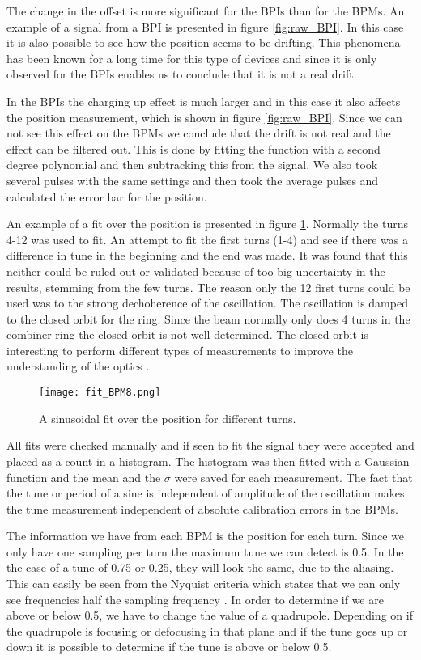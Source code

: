  
The change in the offset is more significant for the BPIs than for the BPMs. An example of a signal from a BPI is presented in figure \ref{fig:raw_BPI}. In this case it is also possible to see how the position seems to be drifting. This phenomena has been known for a long time for this type of devices and since it is only observed for the BPIs enables us to conclude that it is not a real drift.  
 

In the BPIs the charging up effect is much larger and in this case it also affects the position measurement, which is shown in figure \ref{fig:raw_BPI}. Since we can not see this effect on the BPMs we conclude that the drift is not real and the effect can be filtered out. This is done by fitting the function with a second degree polynomial and then subtracking this from the signal. We also took several pulses with the same settings and then took the average pulses and calculated the error bar for the position. 
 
 
An example of a fit over the position is presented in figure \ref{fig:fitOfPosition}. Normally the turns 4-12 was used to fit. An attempt to fit the first turns (1-4) and see if there was a difference in tune in the beginning and the end was made. It was found that this neither could be ruled out or validated because of too big uncertainty in the results, stemming from the few turns. The reason only the 12 first turns could be used was to the strong dechoherence of the oscillation. The oscillation is damped to the closed orbit for the ring. Since the beam normally only does 4 turns in the combiner ring the closed orbit is not well-determined. The closed orbit is interesting to perform different types of measurements to improve the understanding of the optics \cite{zimmermann_book}.
\begin{figure}[!h]
\centering
\texttt{[image: fit\_BPM8.png]}
\caption{A sinusoidal fit over the position for different turns. \label{fig:fitOfPosition}}
\end{figure}
All fits were checked manually and if seen to fit the signal they were accepted and placed as a count in a histogram. The histogram was then fitted with a Gaussian function and the mean and the $\sigma$ were saved for each measurement.
The fact that the tune or period of a sine is independent of amplitude of the oscillation makes the tune measurement independent of absolute calibration errors in the BPMs.
 
The information we have from each BPM is the position for each turn. Since we only have one sampling per turn the maximum tune we can detect is 0.5. In the the case of a tune of 0.75 or 0.25, they will look the same, due to the aliasing. This can easily be seen from the Nyquist criteria which states that we can only see frequencies half the sampling frequency \cite{wiki:nyqvist}. In order to determine if we are above or below 0.5, we have to change the value of a quadrupole. Depending on if the quadrupole is focusing or defocusing in that plane and if the tune goes up or down it is possible to determine if the tune is above or below 0.5.  

